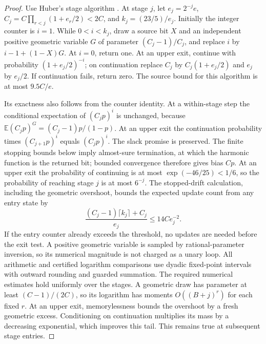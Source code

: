 \begin{proof}
Use Huber's stage algorithm \cite[Theorem~1]{huber2016linear}.
At stage $j$, let $e_j=2^{-j}e$,
$C_j=C\prod_{r<j}(1+e_r/2)<2C$, and $k_j=(23/5)/e_j$.
Initially the integer counter is $i=1$. While $0<i<k_j$, draw a source bit $X$ and
an independent positive geometric variable $G$ of parameter
$(C_j-1)/C_j$, and replace $i$ by $i-1+(1-X)G$. At $i=0$, return
one. At an upper exit, continue with probability $(1+e_j/2)^{-i}$;
on continuation replace $C_j$ by $C_j(1+e_j/2)$ and $e_j$ by $e_j/2$.
If continuation fails, return zero. The source bound for this
algorithm is at most $9.5C/e$.

Its exactness also follows from the counter identity. At a within-stage
step the conditional expectation of $(C_jp)^i$ is unchanged, because
$\mathbb E(C_jp)^G=(C_j-1)p/(1-p)$. At an upper exit the continuation
probability times $(C_{j+1}p)^i$ equals $(C_jp)^i$. The slack promise
is preserved. The finite stopping bounds below imply almost-sure
termination, at which the harmonic function is the returned bit;
bounded convergence therefore gives bias $Cp$.
At an upper exit the probability of continuing is at
most $\exp(-46/25)<1/6$, so the probability of reaching stage $j$ is
at most $6^{-j}$. The stopped-drift calculation, including the geometric
overshoot, bounds the expected update count from any entry state by
\[
 \frac{(C_j-1)\lceil k_j\rceil+C_j}{e_j}
 \le14C e_j^{-2}.
\]
If the entry counter already exceeds the threshold, no updates are
needed before the exit test. A positive geometric variable is sampled
by rational-parameter inversion, so its numerical magnitude is not
charged as a unary loop. All arithmetic and certified logarithm comparisons use dyadic
fixed-point intervals with outward rounding and guarded summation.
The required numerical estimates hold uniformly over the stages. A geometric draw has parameter at least $(C-1)/(2C)$, so
its logarithm has moments $O((B+j)^r)$ for each fixed $r$. At an
upper exit, memorylessness bounds the overshoot by a fresh geometric
excess. Conditioning on continuation multiplies its mass by a
decreasing exponential, which improves this tail. This remains true
at subsequent stage entries.


\end{proof}
